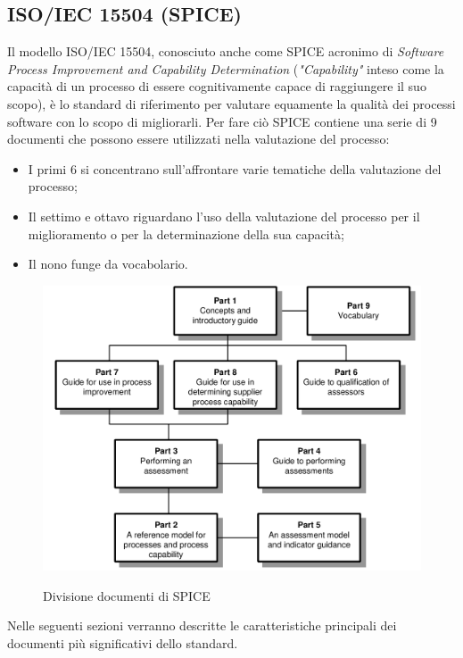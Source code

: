 \documentclass[../norme-di-progetto.tex]{subfiles}
\begin{document}
\subsection{ISO/IEC 15504 (SPICE)}%
\label{sec:iso/iec_15504_spice}
Il modello ISO/IEC 15504, conosciuto anche come SPICE acronimo di \textit{Software Process Improvement and Capability Determination} (\textit{"Capability"} inteso come la capacità di un processo di essere cognitivamente capace di raggiungere il suo scopo), è lo standard di riferimento per valutare equamente la qualità dei processi software con lo scopo di migliorarli.
Per fare ciò SPICE contiene una serie di 9 documenti che possono essere utilizzati nella valutazione del processo:
\begin{itemize}
    \item I primi 6 si concentrano sull'affrontare varie tematiche della valutazione del processo;
    \item Il settimo e ottavo riguardano l'uso della valutazione del processo per il miglioramento o per la determinazione della sua capacità;
    \item Il nono funge da vocabolario.
\end{itemize}

\begin{figure}[H]
    \centering
    \includegraphics[width=15cm]{img/spice_doc.png}
    \label{fig:spice_documenti}
    \caption{Divisione documenti di SPICE}
\end{figure}


Nelle seguenti sezioni verranno descritte le caratteristiche principali dei documenti più significativi dello standard.
\end{document}

